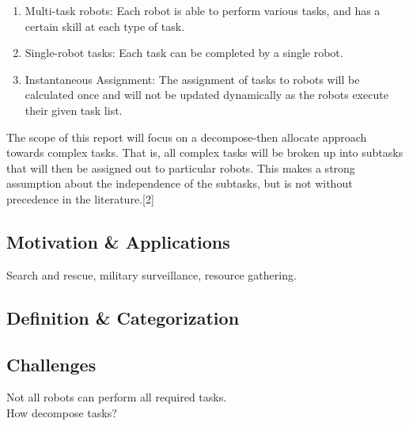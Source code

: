 \documentclass[a4paper]{article}
\begin{document}
\begin{enumerate}
\item Multi-task robots: Each robot is able to perform various tasks, and has a certain skill at each type of task.
\item Single-robot tasks: Each task can be completed by a single robot.
\item Instantaneous Assignment: The assignment of tasks to robots will be calculated once and will not be updated dynamically as the robots execute their given task list.
\end{enumerate}

The scope of this report will focus on a decompose-then allocate approach towards complex tasks. That is, all complex tasks will be broken up into subtasks that will then be assigned out to particular robots. This makes a strong assumption about the independence of the subtasks, but is not without precedence in the literature.[2]\\




\subsection{Motivation \& Applications}
Search and rescue, military surveillance, resource gathering.

\subsection{Definition \& Categorization}

\subsection{Challenges}
Not all robots can perform all required tasks.\\
How decompose tasks?\\



\end{document}
